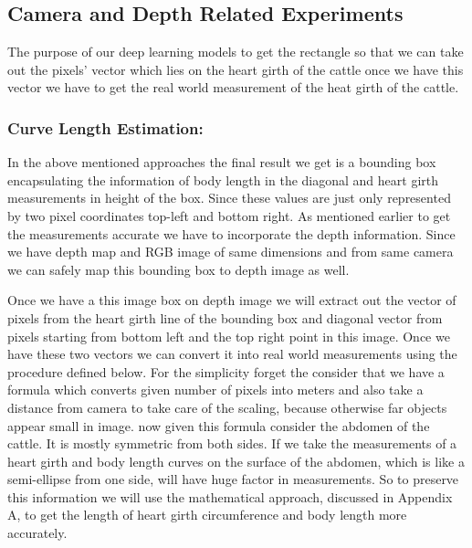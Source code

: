 \subsection{Camera and Depth Related Experiments}
The purpose of our deep learning models to get the rectangle so that we can take out the pixels' vector which lies on the heart girth of the cattle once we have this vector we have to get the real world measurement of the heat girth of the cattle. 


\subsubsection{Curve Length Estimation:}

In the above mentioned approaches the final result we get is a bounding box encapsulating the information of body length in the diagonal and heart girth measurements in height of the box. Since these values are just only represented by two pixel coordinates top-left and bottom right. As mentioned earlier to get the measurements accurate we have to incorporate the depth information. Since we have depth map and RGB image of same dimensions and from same camera we can safely map this bounding box to depth image as well. 

Once we have a this image box on depth image we will extract out the vector of pixels from the heart girth line of the bounding box and diagonal vector from pixels starting from bottom left and the top right  point in this image.
Once we have these two vectors we can convert it into real world measurements using the procedure defined below.   
For the simplicity forget the consider that we have a formula which converts  given number of pixels into meters and also take a distance from camera to take care of the scaling, because otherwise far objects appear small in image. now given this formula consider the abdomen of the cattle. It is mostly symmetric from both sides. If we take the measurements of a heart girth and body length curves on the surface of the abdomen, which is like a semi-ellipse from one side, will have huge factor in measurements. So to preserve this information we will use the mathematical approach, discussed in Appendix A, to get the length of heart girth circumference and body length more accurately. 






 

 
